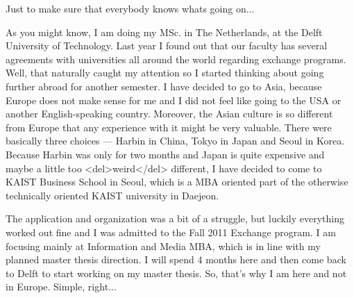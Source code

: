 \begin{post}
	\begin{content}
Just to make sure that everybody knows whats going on...



As you might know, I am doing my MSc. in The Netherlands, at the Delft University of Technology. Last year I found out that our faculty has several agreements with universities all around the world regarding exchange programs. Well, that naturally caught my attention so I started thinking about going further abroad for another semester. I have decided to go to Asia, because Europe does not make sense for me and I did not feel like going to the USA or another English-speaking country. Moreover, the Asian culture is so different from Europe that any experience with it might be very valuable. There were basically three choices — Harbin in China, Tokyo in Japan and Seoul in Korea. Because Harbin was only for two months and Japan is quite expensive and maybe a little too <del>weird</del> different, I have decided to come to KAIST Business School in Seoul, which is a MBA oriented part of the otherwise technically oriented KAIST university in Daejeon.



The application and organization was a bit of a struggle, but luckily everything worked out fine and I was admitted to the Fall 2011 Exchange program. I am focusing mainly at Information and Media MBA, which is in line with my planned master thesis direction. I will spend 4 months here and then come back to Delft to start working on my master thesis. So, that's why I am here and not in Europe. Simple, right...
	\end{content}
\end{post}
